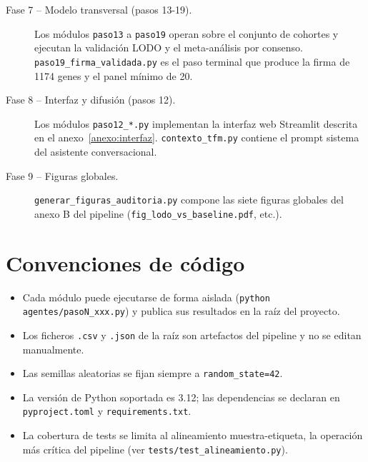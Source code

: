 \begin{description}
  \item[Fase 7 -- Modelo transversal (pasos 13-19).] Los módulos
  \texttt{paso13} a \texttt{paso19} operan sobre el conjunto de cohortes
  y ejecutan la validación LODO y el meta-análisis por consenso.
  \texttt{paso19\_firma\_validada.py} es el paso terminal que produce la
  firma de 1174 genes y el panel mínimo de 20.

  \item[Fase 8 -- Interfaz y difusión (pasos 12).] Los módulos
  \texttt{paso12\_*.py} implementan la interfaz web Streamlit descrita
  en el anexo~\ref{anexo:interfaz}. \texttt{contexto\_tfm.py} contiene
  el prompt sistema del asistente conversacional.

  \item[Fase 9 -- Figuras globales.] \texttt{generar\_figuras\_auditoria.py}
  compone las siete figuras globales del anexo B del pipeline
  (\texttt{fig\_lodo\_vs\_baseline.pdf}, etc.).
\end{description}

\section*{Convenciones de código}
{}

\begin{itemize}
  \item Cada módulo puede ejecutarse de forma aislada
  (\texttt{python agentes/pasoN\_xxx.py}) y publica sus resultados en la
  raíz del proyecto.
  \item Los ficheros \texttt{.csv} y \texttt{.json} de la raíz son
  artefactos del pipeline y no se editan manualmente.
  \item Las semillas aleatorias se fijan siempre a \texttt{random\_state=42}.
  \item La versión de Python soportada es 3.12; las dependencias se
  declaran en \texttt{pyproject.toml} y \texttt{requirements.txt}.
  \item La cobertura de tests se limita al alineamiento
  muestra-etiqueta, la operación más crítica del pipeline (ver
  \texttt{tests/test\_alineamiento.py}).
\end{itemize}
